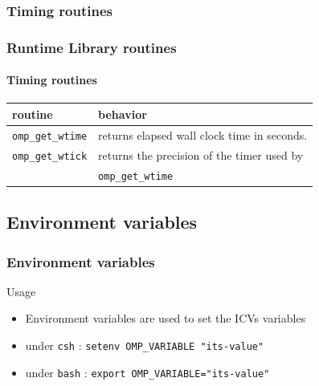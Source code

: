 \subsubsection{Timing routines}

\begin{frame}
\frametitle{Runtime Library routines}
\framesubtitle{Timing routines}

\begin{center}
\begin{tabular}{|l|l|}
\hline
  \textbf{routine} & \textbf{behavior}  \\
\hline
\hline
\texttt{omp\_get\_wtime} &
returns elapsed wall clock time in seconds. \\
\hline
\texttt{omp\_get\_wtick} &
returns the precision of the timer used by \\
& \texttt{omp\_get\_wtime} \\
\hline
\end{tabular}
\end{center}

\end{frame}





\subsection{Environment variables}

\begin{frame}
\frametitle{Environment variables}
\begin{exampleblock}{Usage}
\begin{itemize}
\item{Environment variables are used to set the ICVs variables}
\item{under \texttt{csh} : \texttt{setenv OMP\_VARIABLE "its-value"}}
\item{under \texttt{bash} : \texttt{export OMP\_VARIABLE="its-value"}}
\end{itemize}
\end{exampleblock}
\end{frame}

